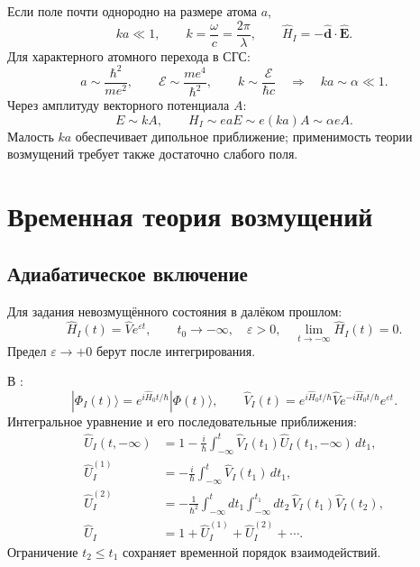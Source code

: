 \documentclass[../final.tex]{subfiles}
\begin{document}
Если поле почти однородно на размере атома \(a\),
\begin{equation*}
    ka\ll1,\qquad k=\frac\omega c=\frac{2\pi}{\lambda},
    \qquad \hat H_I=-\hat{\mathbf d}\cdot\hat{\mathbf E}.
\end{equation*}
Для характерного атомного перехода в СГС:
\begin{equation*}
    a\sim\frac{\hbar^2}{me^2},\qquad
    \mathcal E\sim\frac{me^4}{\hbar^2},\qquad
    k\sim\frac{\mathcal E}{\hbar c}
    \quad\Rightarrow\quad ka\sim\alpha\ll1.
\end{equation*}
Через амплитуду векторного потенциала \(A\):
\begin{equation*}
    E\sim kA,\qquad H_I\sim eaE\sim e(ka)A\sim\alpha eA.
\end{equation*}
Малость \(ka\) обеспечивает дипольное приближение;
применимость теории возмущений требует также достаточно слабого поля.

\section{Временная теория возмущений}

\subsection{Адиабатическое включение}

Для задания невозмущённого состояния в далёком прошлом:
\begin{equation*}
    \hat H_I(t)=\hat V e^{\varepsilon t},\qquad
    t_0\to-\infty,\quad\varepsilon>0,\quad
    \lim_{t\to-\infty}\hat H_I(t)=0.
\end{equation*}
Предел \(\varepsilon\to+0\) берут после интегрирования.

В :
\begin{equation*}
    |\Phi_I(t)\rangle=e^{i\hat H_0t/\hbar}|\Phi(t)\rangle,\qquad
    \hat V_I(t)=e^{i\hat H_0t/\hbar}\hat V e^{-i\hat H_0t/\hbar}
    e^{\varepsilon t}.
\end{equation*}
Интегральное уравнение и его последовательные приближения:
\begin{align*}
    \hat U_I(t,-\infty)
    &=1-\frac{i}{\hbar}\int_{-\infty}^{t}
      \hat V_I(t_1)\hat U_I(t_1,-\infty)\,dt_1,\\
    \hat U_I^{(1)}
    &=-\frac{i}{\hbar}\int_{-\infty}^{t}\hat V_I(t_1)\,dt_1,\\
    \hat U_I^{(2)}
    &=-\frac1{\hbar^2}\int_{-\infty}^{t}dt_1
       \int_{-\infty}^{t_1}dt_2\,\hat V_I(t_1)\hat V_I(t_2),\\
    \hat U_I&=1+\hat U_I^{(1)}+\hat U_I^{(2)}+\cdots.
\end{align*}
Ограничение \(t_2\le t_1\) сохраняет временной порядок взаимодействий.
\end{document}
